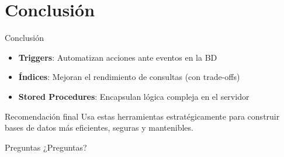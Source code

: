 \documentclass{beamer}
\begin{document}
\section{Conclusión}
\begin{frame}{Conclusión}
\begin{itemize}
\item \textbf{Triggers}: Automatizan acciones ante eventos en la BD
\item \textbf{Índices}: Mejoran el rendimiento de consultas (con trade-offs)
\item \textbf{Stored Procedures}: Encapsulan lógica compleja en el servidor
\end{itemize}

\begin{block}{Recomendación final}
Usa estas herramientas estratégicamente para construir bases de datos más eficientes, seguras y mantenibles.
\end{block}
\end{frame}

\begin{frame}{Preguntas}
\centering
¿Preguntas?
\end{frame}
\end{document}
